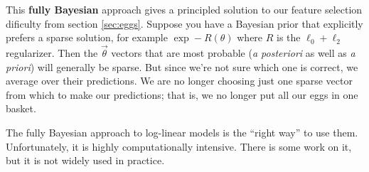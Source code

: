 \documentclass[11pt]{article}
\newcommand{\vtheta}{\vec{\theta}}
\begin{document}
This {\bf fully Bayesian} approach gives a principled solution to our feature selection dificulty from section \ref{sec:eggs}.  Suppose you have a Bayesian prior that explicitly prefers a sparse solution, for example $\exp -R(\theta)$ where $R$ is the $\ell_0+\ell_2$ regularizer.  Then the $\vtheta$ vectors that are most probable ({\em a posteriori} as well as {\em a priori}) will generally be sparse.  But since we're not sure which one is correct, we average over their predictions.  We are no longer choosing just one sparse vector from which to make our predictions; that is, we no longer put all our eggs in one basket.

The fully Bayesian approach to log-linear models is the ``right way'' to use them.  Unfortunately, it is highly computationally intensive.  There is some work on it, but it is not widely used in practice.
\end{document}
